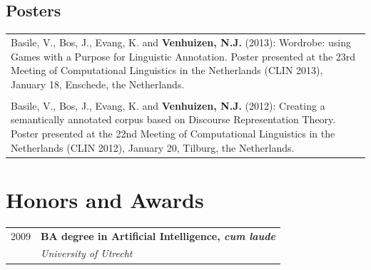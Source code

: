 \documentclass[a4paper,10pt]{article}
\def\leftcolwidth{.15\textwidth}
\begin{document}
\subsection*{Posters}

\noindent
\begin{tabularx}{\textwidth}{ X }
    Basile, V., Bos, J., Evang, K. and \textbf{Venhuizen, N.J.} (2013): Wordrobe: 
    using Games with a Purpose for Linguistic Annotation. Poster presented at 
    the 23rd Meeting of Computational Linguistics in the Netherlands 
    (CLIN 2013), January 18, Enschede, the Netherlands.\\
    \\
    Basile, V., Bos, J., Evang, K. and \textbf{Venhuizen, N.J.} (2012): Creating
    a semantically annotated corpus based on Discourse Representation
    Theory. Poster presented at the 22nd Meeting of Computational
    Linguistics in the Netherlands (CLIN 2012), January 20, Tilburg, 
    the Netherlands.\\
\end{tabularx}





\section*{Honors and Awards}

\noindent
\begin{tabularx}{\textwidth}{ p{\leftcolwidth} X }
  2009
  & \textbf{BA degree in Artificial Intelligence, \textit{cum laude}}\\
  & \textit{University of Utrecht}\\
\end{tabularx}
\end{document}

